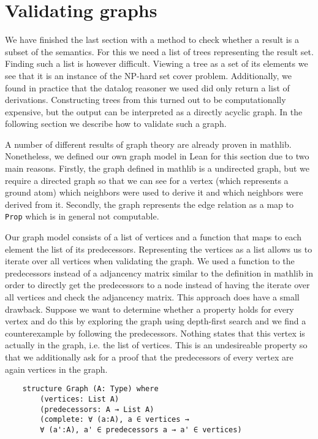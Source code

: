 \section{Validating graphs}\label{sec:valGraph}

We have finished the last section with a method to check whether a result is a subset of the semantics. For this we need a list of trees representing the result set. Finding such a list is however difficult. Viewing a tree as a set of its elements we see that it is an instance of the NP-hard set cover problem. Additionally, we found in practice that the datalog reasoner we used did only return a list of derivations. Constructing trees from this turned out to be computationally expensive, but the output can be interpreted as a directly acyclic graph. In the following section we describe how to validate such a graph.

A number of different results of graph theory are already proven in mathlib. Nonetheless, we defined our own graph model in Lean for this section due to two main reasons. Firstly, the graph defined in mathlib is a undirected graph, but we require a directed graph so that we can see for a vertex (which represents a ground atom) which neighbors were used to derive it and which neighbors were derived from it. Secondly, the graph represents the edge relation as a map to \texttt{Prop} which is in general not computable.


Our graph model consists of a list of vertices and a function that maps to each element the list of its predecessors. Representing the vertices as a list allows us to iterate over all vertices when validating the graph. We used a function to the predecessors instead of a adjancency matrix similar to the definition in mathlib in order to directly get the predecessors to a node instead of having the iterate over all vertices and check the adjancency matrix. This approach does have a small drawback. Suppose we want to determine whether a property holds for every vertex and do this by exploring the graph using depth-first search and we find a counterexample by following the predecessors. Nothing states that this vertex is actually in the graph, i.e. the list of vertices. This is an undesireable property so that we additionally ask for a proof that the predecessors of every vertex are again vertices in the graph.

\begin{lstlisting}
    structure Graph (A: Type) where
        (vertices: List A)
        (predecessors: A → List A)
        (complete: ∀ (a:A), a ∈ vertices →  
        ∀ (a':A), a' ∈ predecessors a → a' ∈ vertices)
\end{lstlisting}

